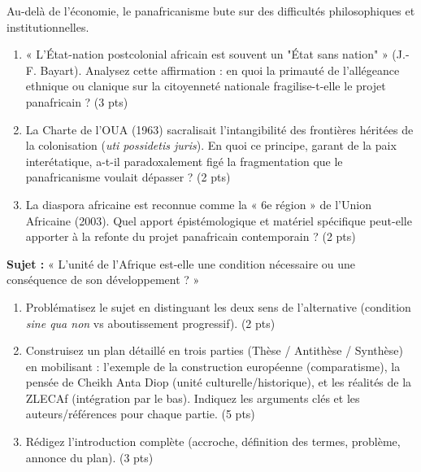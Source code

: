 \documentclass[11pt]{article}
\begin{document}
\begin{exercice}
Au-delà de l'économie, le panafricanisme bute sur des difficultés philosophiques et institutionnelles.
\begin{enumerate}
    \item « L'État-nation postcolonial africain est souvent un "État sans nation" » (J.-F. Bayart). Analysez cette affirmation : en quoi la primauté de l'allégeance ethnique ou clanique sur la citoyenneté nationale fragilise-t-elle le projet panafricain ? (3 pts)
    \item La Charte de l'OUA (1963) sacralisait l'intangibilité des frontières héritées de la colonisation (\textit{uti possidetis juris}). En quoi ce principe, garant de la paix interétatique, a-t-il paradoxalement figé la fragmentation que le panafricanisme voulait dépasser ? (2 pts)
    \item La diaspora africaine est reconnue comme la « 6e région » de l'Union Africaine (2003). Quel apport épistémologique et matériel spécifique peut-elle apporter à la refonte du projet panafricain contemporain ? (2 pts)
\end{enumerate}
\end{exercice}

\begin{exercice}
\textbf{Sujet :} « L'unité de l'Afrique est-elle une condition nécessaire ou une conséquence de son développement ? »
\begin{enumerate}
    \item Problématisez le sujet en distinguant les deux sens de l'alternative (condition \textit{sine qua non} vs aboutissement progressif). (2 pts)
    \item Construisez un plan détaillé en trois parties (Thèse / Antithèse / Synthèse) en mobilisant : l'exemple de la construction européenne (comparatisme), la pensée de Cheikh Anta Diop (unité culturelle/historique), et les réalités de la ZLECAf (intégration par le bas). Indiquez les arguments clés et les auteurs/références pour chaque partie. (5 pts)
    \item Rédigez l'introduction complète (accroche, définition des termes, problème, annonce du plan). (3 pts)
\end{enumerate}
\end{exercice}
\end{document}
